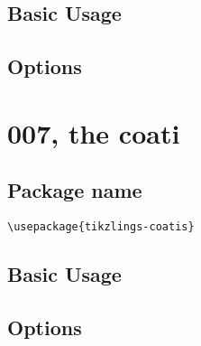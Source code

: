 \documentclass[parskip=half]{scrartcl}
\begin{document}
\subsection{Basic Usage}

\begin{tcblisting}{}
\bear
\end{tcblisting}

\subsection{Options}

\begin{tcblisting}{}
\bear[body=SteelBlue]
\end{tcblisting}

\begin{tcblisting}{}
\bear[3D]
\end{tcblisting}


\clearpage
\section[\textbackslash coati]{007, the coati}

\subsection{Package name}

\begin{tcolorbox}
\vspace*{0.5cm}
\lstinline|\usepackage{tikzlings-coatis}|
\vspace*{0.5cm}
\end{tcolorbox}

\subsection{Basic Usage}

\begin{tcblisting}{}
\coati
\end{tcblisting}

\subsection{Options}

\begin{tcblisting}{}
\coati[body=SteelBlue]
\end{tcblisting}
\end{document}
